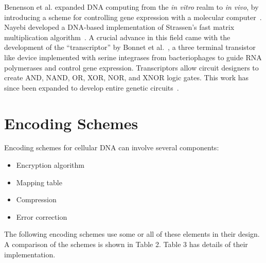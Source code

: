\documentclass{bioinfo}
\begin{document}
Benenson et al. expanded DNA computing from the \textit{in vitro} realm to \textit{in vivo}, by introducing a scheme for controlling gene expression with a molecular computer~\cite{BENENSON2004}. Nayebi developed a DNA-based implementation of Strassen's fast matrix multiplication algorithm~\cite{NAYEBI2009}. A crucial advance in this field came with the development of the ``transcriptor'' by Bonnet et al.~\cite{BONNET2013}, a three terminal transistor like device implemented with serine integrases from bacteriophages to guide RNA polymerases and control gene expression. Transcriptors allow circuit designers to create AND, NAND, OR, XOR, NOR, and XNOR logic gates. This work has since been expanded to develop entire genetic circuits~\cite{BROPHY2014,NIELSEN2016}.



\section{Encoding Schemes}

Encoding schemes for cellular DNA can involve several components:

\begin{itemize}
\item Encryption algorithm
\item Mapping table
\item Compression
\item Error correction
\end{itemize}

The following encoding schemes use some or all of these elements in their design. A comparison of the schemes is shown in Table 2. Table 3 has details of their implementation.
\end{document}
